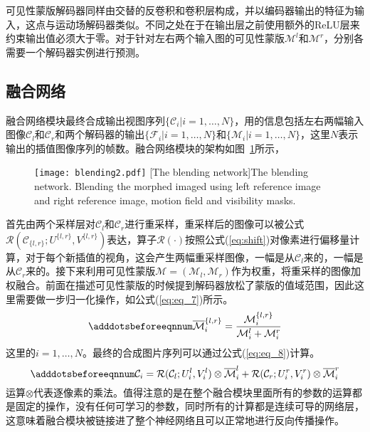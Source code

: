 可见性蒙版解码器同样由交替的反卷积和卷积层构成，并以编码器输出的特征为输入，这点与运动场解码器类似。不同之处在于在输出层之前使用额外的ReLU层来约束输出值必须大于零。对于针对左右两个输入图的可见性蒙版$\mathcal{M}^l$和$\mathcal{M}^r$，分别各需要一个解码器实例进行预测。

\subsection{融合网络}
融合网络模块最终合成输出视图序列$\{\mathcal{C}_i|i=1, \dots, N\}$，用的信息包括左右两幅输入图像$\mathcal{C}_l$和$\mathcal{C}_r$和两个解码器的输出$\{\mathcal{F}_i|i=1,\dots,N\}$和$\{\mathcal{M}_i|i=1,\dots,N\}$，这里$N$表示输出的插值图像序列的帧数。融合网络模块的架构如图~\ref{fig:cvmn_blending}所示，
\begin{figure}[!htbp]
    \centering
    \texttt{[image: blending2.pdf]}
    [The blending network]{The blending network. Blending the morphed imaged using left reference image and right reference image, motion field and visibility masks.}
    \label{fig:cvmn_blending}
\end{figure}
首先由两个采样层对$\mathcal{C}_l$和$\mathcal{C}_r$进行重采样，重采样后的图像可以被公式$\mathcal{R}(\mathcal{C}_{\{l, r\}};U^{\{l, r\}}, V^{\{l, r\}})$表达，算子$\mathcal{R}(\cdot)$按照公式(\ref{eq:shift})对像素进行偏移量计算，对于每个新插值的视角，这会产生两幅重采样图像，一幅是从$\mathcal{C}_l$来的，一幅是从$\mathcal{C}_r$来的。接下来利用可见性蒙版$\mathcal{M}=(\mathcal{M}_l, \mathcal{M}_r)$作为权重，将重采样的图像加权融合。前面在描述可见性蒙版的时候提到解码器放松了蒙版的值域范围，因此这里需要做一步归一化操作，如公式(\ref{eq:eq_7})所示。
\begin{equation}\label{eq:eq_7}
    \adddotsbeforeeqnnum%
    \overline{\mathcal{M}}_i^{\{l, r\}} = \frac{\mathcal{M}_i^{\{l, r\}}}{\mathcal{M}_i^l + \mathcal{M}_i^r}
\end{equation}
这里的$i=1, \dots, N$。最终的合成图片序列可以通过公式(\ref{eq:eq_8})计算。
\begin{equation}\label{eq:eq_8}
    \adddotsbeforeeqnnum%
    \mathcal{C}_i = \mathcal{R}(\mathcal{C}_l; U_i^l, V_i^l) \otimes \overline{\mathcal{M}}_i^l + \mathcal{R}(\mathcal{C}_r; U_i^r, V_i^r) \otimes \overline{\mathcal{M}}_i^r
\end{equation}
运算$\otimes$代表逐像素的乘法。值得注意的是在整个融合模块里面所有的参数的运算都是固定的操作，没有任何可学习的参数，同时所有的计算都是连续可导的网络层，这意味着融合模块被链接进了整个神经网络且可以正常地进行反向传播操作。

